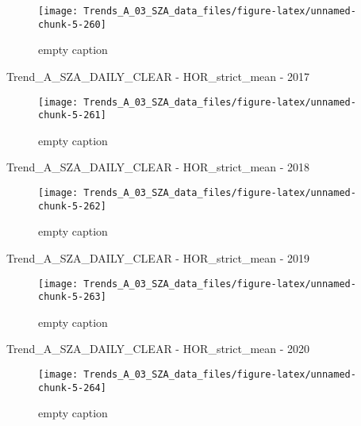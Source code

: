 \documentclass[
  10pt,
  a4paper,oneside]{article}
\begin{document}
\begin{figure}[!ht]

{\centering \texttt{[image: Trends\_A\_03\_SZA\_data\_files/figure-latex/unnamed-chunk-5-260]} 

}

\caption{ empty caption }\label{fig:unnamed-chunk-5-260}
\end{figure}

Trend\_A\_SZA\_DAILY\_CLEAR - HOR\_strict\_mean - 2017

\begin{figure}[!ht]

{\centering \texttt{[image: Trends\_A\_03\_SZA\_data\_files/figure-latex/unnamed-chunk-5-261]} 

}

\caption{ empty caption }\label{fig:unnamed-chunk-5-261}
\end{figure}

Trend\_A\_SZA\_DAILY\_CLEAR - HOR\_strict\_mean - 2018

\begin{figure}[!ht]

{\centering \texttt{[image: Trends\_A\_03\_SZA\_data\_files/figure-latex/unnamed-chunk-5-262]} 

}

\caption{ empty caption }\label{fig:unnamed-chunk-5-262}
\end{figure}

Trend\_A\_SZA\_DAILY\_CLEAR - HOR\_strict\_mean - 2019

\begin{figure}[!ht]

{\centering \texttt{[image: Trends\_A\_03\_SZA\_data\_files/figure-latex/unnamed-chunk-5-263]} 

}

\caption{ empty caption }\label{fig:unnamed-chunk-5-263}
\end{figure}

Trend\_A\_SZA\_DAILY\_CLEAR - HOR\_strict\_mean - 2020

\begin{figure}[!ht]

{\centering \texttt{[image: Trends\_A\_03\_SZA\_data\_files/figure-latex/unnamed-chunk-5-264]} 

}

\caption{ empty caption }\label{fig:unnamed-chunk-5-264}
\end{figure}
\end{document}
